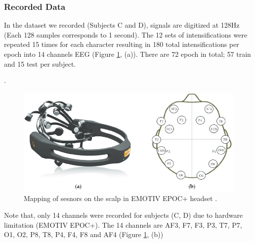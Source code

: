 \subsubsection{Recorded Data}
In the dataset we recorded (Subjects C and D), signals are digitized at 128Hz (Each 128 samples corresponds to 1 second). The 12 sets of intensifications were repeated 15 times for each character resulting in 180 total intensifications per epoch into 14 channels EEG (Figure \ref{fig:emotiv-14-channels}, (a)). There are 72 epoch in total; 57 train and 15 test per subject.\par.
\begin{figure}
    \centering
    \includegraphics[width=\figureWidth]{images/approach/emotiv_14_channels.jpg}
    \caption{Mapping of sesnors on the scalp in EMOTIV EPOC+ headset \cite{article8}.}
    \label{fig:emotiv-14-channels}
\end{figure}
Note that, only 14 channels were recorded for subjects (C, D) due to hardware limitation (EMOTIV EPOC+). The 14 channels are AF3, F7, F3, P3, T7, P7, O1, O2, P8, T8, P4, F4, F8 and AF4 (Figure \ref{fig:emotiv-14-channels}, (b))\par
